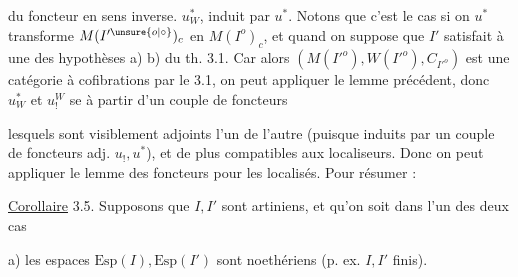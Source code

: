 du foncteur en sens inverse. $u_W^*$, induit
par $u^*$. Notons que c'est le cas si on
 $u^*$ transforme $M(I'^{\unsure{o|\circ}})_c$ en
$M(I^o)_c$, et quand on suppose que
$I'$  satisfait  à une des hypothèses
a) b) du th. 3.1. Car alors $(M(I'^o),W(I'^o),C_{I'^o})$
est une catégorie à cofibrations par le 
3.1, on peut  appliquer le lemme
précédent, donc $u_W^*$ et $u_!^W$ se  à
partir d'un couple de foncteurs


lesquels sont visiblement adjoints l'un
de l'autre (puisque induits par un
couple de foncteurs adj. $u_!,u^*$), et
de plus compatibles aux localiseurs.
Donc on peut appliquer le lemme des
foncteurs  pour les localisés. Pour
résumer :

\uline{Corollaire} 3.5. Supposons que $I,I'$ sont
 artiniens, et qu'on soit dans l'un
des deux cas 

a)  les espaces $\mathrm{Esp}(I),\mathrm{Esp}(I')$
sont noethériens (p. ex. $I,I'$ finis).
